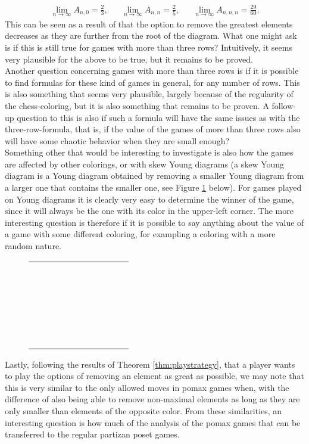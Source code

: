 \begin{align*}
\lim_{n\rightarrow\infty}A_{n,0}=\frac{2}{3},&&
\lim_{n\rightarrow\infty}A_{n,n}=\frac{2}{5},&&
\lim_{n\rightarrow\infty}A_{n,n,n}=\frac{29}{60}.
\end{align*} 
This can be seen as a result of that the option to remove the greatest elements decreases as they are further from the root of the diagram. What one might ask is if this is still true for games with more than three rows? Intuitively, it seems very plausible for the above to be true, but it remains to be proved.
\\
Another question concerning games with more than three rows is if it is possible to find formulas for these kind of games in general, for any number of rows. This is also something that seems very plausible, largely because of the regularity of the chess-coloring, but it is also something that remains to be proven. A follow-up question to this is also if such a formula will have the same issues as with the three-row-formula, that is, if the value of the games of more than three rows also will have some chaotic behavior when they are small enough?
\\
Something other that would be interesting to investigate is also how the games are affected by other colorings, or with skew Young diagrams (a skew Young diagram is a Young diagram obtained by removing a smaller Young diagram from a larger one that contains the smaller one, see Figure \ref{fig:skewyoung} below). For games played on Young diagrams it is clearly very easy to determine the winner of the game, since it will always be the one with its color in the upper-left corner. The more interesting question is therefore if it is possible to say anything about the value of a game with some different coloring, for exampling a coloring with a more random nature.

\begin{figure}[H]
\centering
\begin{tabular}{ | c | c | c | c | c | c | c |}
\hhline{-------}
\cellcolor[gray]{0.5}&\cellcolor[gray]{0.5}&\cellcolor[gray]{0.5}&\cellcolor[gray]{0.5}&~&~&~\\
\hhline{-------}
\cellcolor[gray]{0.5}&\cellcolor[gray]{0.5}&~&~&~\\
\hhline{-----~~}
\cellcolor[gray]{0.5}&~\\
\cline{1-2}
~&~\\
\cline{1-2}
~\\
\cline{1-1}
\end{tabular}
\label{fig:skewyoung}
\end{figure}
Lastly, following the results of Theorem \ref{thm:playstrategy}, that a player wants to play the options of removing an element as great as possible, we may note that this is very similar to the only allowed moves in pomax games when, with the difference of also being able to remove non-maximal elements as long as they are only smaller than elements of the opposite color. From these similarities, an interesting question is how much of the analysis of the pomax games that can be transferred to the regular partizan poset games.